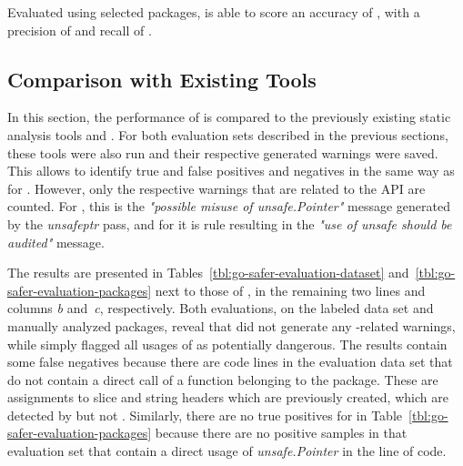 \begin{hero}
    Evaluated using  selected packages, \toolSafer{} is able to score an accuracy of , with
    a precision of  and recall of .
\end{hero}



\subsection{Comparison with Existing Tools}\label{subsec:go-safer:evaluation:linters-comparison}

In this section, the performance of \toolSafer{} is compared to the previously existing static analysis tools \toolVet{}
and \toolGosec{}.
For both evaluation sets described in the previous sections, these tools were also run and their respective generated
warnings were saved.
This allows to identify true and false positives and negatives in the same way as for \toolSafer{}.
However, only the respective warnings that are related to the \unsafe{} \acrshort{API} are counted.
For \toolVet{}, this is the \textit{"possible misuse of unsafe.Pointer"} message generated by the \textit{unsafeptr}
pass, and for \toolGosec{} it is rule  resulting in the \textit{"use of unsafe should be
audited"} message.

The results are presented in Tables~\ref{tbl:go-safer-evaluation-dataset} and~\ref{tbl:go-safer-evaluation-packages}
next to those of \toolSafer{}, in the remaining two lines and columns \textit{b} and~\textit{c}, respectively.
Both evaluations, on the labeled data set and  manually analyzed packages, reveal that \toolVet{} did not
generate any \unsafe{}-related warnings, while \toolGosec{} simply flagged all usages of \unsafe{} as potentially
dangerous.
The \toolGosec{} results contain some false negatives because there are code lines in the evaluation data set that do
not contain a direct call of a function belonging to the \unsafe{} package.
These are assignments to slice and string headers which are previously created, which are detected by \toolSafer{} but
not \toolGosec{}.
Similarly, there are no true positives for \toolGosec{} in Table~\ref{tbl:go-safer-evaluation-packages} because there
are no positive samples in that evaluation set that contain a direct usage of \textit{unsafe.Pointer} in the line of
code.

